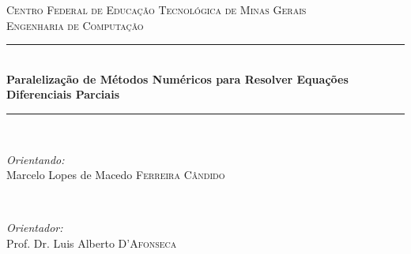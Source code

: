 \begin{titlepage}

	\newcommand{\HRule}{\rule{\linewidth}{0.5mm}} %

	\center %


	\textsc{\LARGE Centro Federal de Educação Tecnológica de Minas Gerais}\\[3.5cm] %
	\textsc{\Large Engenharia de Computação}\\[3.5cm] %


	\HRule \\[0.4cm]
	{\huge \bfseries Paralelização de Métodos Numéricos para Resolver
	Equações Diferenciais Parciais}\\[0.2cm] %
	\HRule \\[2.5cm]


	\begin{minipage}{0.4\textwidth}
		\begin{flushleft} \large
			\emph{Orientando:}\\ Marcelo Lopes de Macedo \textsc{Ferreira Cândido} %
		\end{flushleft}
	\end{minipage}
	~
	\begin{minipage}{0.4\textwidth}
		\begin{flushright} \large
			\emph{Orientador:} \\
			Prof. Dr. Luis Alberto \textsc{D'Afonseca} %
		\end{flushright}
	\end{minipage}\\[7cm]



\end{titlepage}
